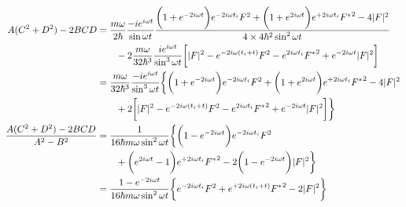 \begin{align}
    A (C^2 + D^2) - 2 BCD
&=
    \dfrac{m \omega}{2 \hbar}
    \dfrac{- i e^{i \omega t} }{\sin \omega t}
    \dfrac{
        \bigg(
            1
        +
            e^{- 2 i \omega t}
        \bigg) 
        e^{- 2 i \omega t_i}
            F^2
    +
        \bigg(
            1
        +
            e^{2 i \omega t}
        \bigg) 
        e^{+ 2 i \omega t_i}
            {F^*}^2
    -
        4 | F |^2
    }{4 \times 4 \hbar^2 \sin^2 \omega t}
\notag\\&\qquad
    - 2
    \dfrac{m \omega}{32 \hbar^3}
    \dfrac{
        i e^{i \omega t}
    }{\sin^3 \omega t}
    \bigg[
        | F |^2
    -
        e^{- 2 i \omega (t_i + t)}
            F^2
    -
        e^{ 2 i \omega t_i}
            {F^*}^2
    +
        e^{- 2 i \omega t}
            | F |^2
    \bigg]
\notag\\&
    =
    \dfrac{m \omega}{32 \hbar^3}
    \dfrac{ - i e^{i \omega t} }{\sin^3 \omega t}
    \bigg\{
        \bigg(
            1
        +
            e^{- 2 i \omega t}
        \bigg)
        e^{- 2 i \omega t_i}
            F^2
    +
        \bigg(
            1
        +
            e^{2 i \omega t}
        \bigg) 
        e^{+ 2 i \omega t_i}
            {F^*}^2
    -
        4 | F |^2
    \notag\\&\qquad
    + 2
        \bigg[
            | F |^2
        -
            e^{- 2 i \omega (t_i + t)}
                F^2
        -
            e^{2 i \omega t_i}
                {F^*}^2
        +
            e^{- 2 i \omega t}
                | F |^2
        \bigg]
    \bigg\}
\notag\\
    \dfrac{
        A ( C^2 + D^2 )
    -
        2 BCD
    }{
        A^2 - B^2
    }
&=
    \dfrac{1}{16 \hbar m \omega \sin^2 \omega t}
    \bigg\{
        \bigg(
            1
    -
            e^{- 2 i \omega t}
        \bigg)
        e^{- 2 i \omega t_i}
            F^2
\notag\\&\qquad
    +
        \bigg(
            e^{2 i \omega t}
        -
            1
        \bigg) 
        e^{+ 2 i \omega t_i}
            {F^*}^2
    - 2
        \bigg(
            1
        -
            e^{- 2 i \omega t}
        \bigg)
        | F |^2
    \bigg\}
\notag\\&
    =
    \dfrac{
            1
        -
            e^{- 2 i \omega t}
    }{16 \hbar m \omega \sin^2 \omega t}
    \bigg\{
        e^{- 2 i \omega t_i}
            F^2
    +
        e^{+ 2 i \omega (t_i + t)}
            {F^*}^2
    - 2
        | F |^2
    \bigg\}

\end{align}

